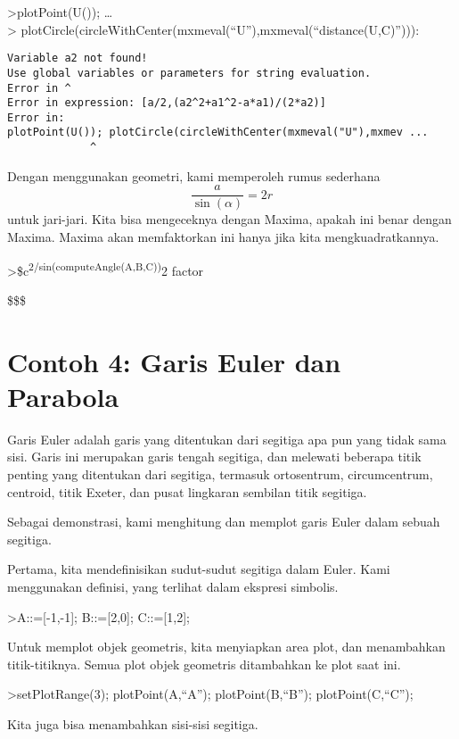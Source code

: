 \documentclass[
]{book}
\begin{document}
\textgreater plotPoint(U()); \ldots{}\\
\textgreater{} plotCircle(circleWithCenter(mxmeval(``U''),mxmeval(``distance(U,C)''))):

\begin{verbatim}
Variable a2 not found!
Use global variables or parameters for string evaluation.
Error in ^
Error in expression: [a/2,(a2^2+a1^2-a*a1)/(2*a2)]
Error in:
plotPoint(U()); plotCircle(circleWithCenter(mxmeval("U"),mxmev ...
             ^
\end{verbatim}

Dengan menggunakan geometri, kami memperoleh rumus sederhana \[\frac{a}{\sin(\alpha)}=2r\]untuk jari-jari. Kita bisa mengeceknya dengan Maxima, apakah ini benar dengan Maxima. Maxima akan memfaktorkan ini hanya jika kita mengkuadratkannya.

\textgreater\$c\textsuperscript{2/sin(computeAngle(A,B,C))}2 \textbar{} factor

\$ \$\$

\section{Contoh 4: Garis Euler dan Parabola}\label{contoh-4-garis-euler-dan-parabola}

Garis Euler adalah garis yang ditentukan dari segitiga apa pun yang tidak sama sisi. Garis ini merupakan garis tengah segitiga, dan melewati beberapa titik penting yang ditentukan dari segitiga, termasuk ortosentrum, circumcentrum, centroid, titik Exeter, dan pusat lingkaran sembilan titik segitiga.

Sebagai demonstrasi, kami menghitung dan memplot garis Euler dalam sebuah segitiga.

Pertama, kita mendefinisikan sudut-sudut segitiga dalam Euler. Kami menggunakan definisi, yang terlihat dalam ekspresi simbolis.

\textgreater A::={[}-1,-1{]}; B::={[}2,0{]}; C::={[}1,2{]};

Untuk memplot objek geometris, kita menyiapkan area plot, dan menambahkan titik-titiknya. Semua plot objek geometris ditambahkan ke plot saat ini.

\textgreater setPlotRange(3); plotPoint(A,``A''); plotPoint(B,``B''); plotPoint(C,``C'');

Kita juga bisa menambahkan sisi-sisi segitiga.
\end{document}
